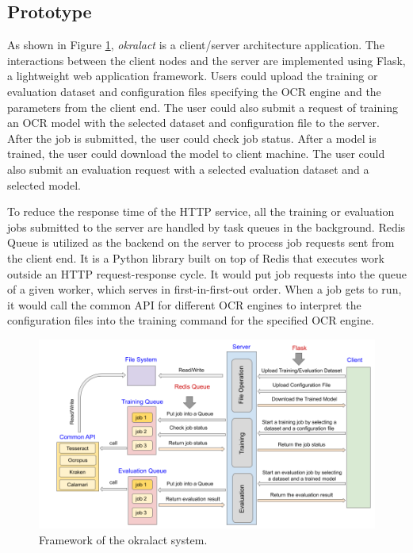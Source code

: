 \documentclass[conference]{IEEEtran}
\begin{document}

\subsection*{Prototype}
\label{sec:prototype}

As shown in Figure \ref{fig:framework}, \textit{okralact} is a client/server
architecture application. The interactions between the client nodes and the
server are implemented using Flask, a lightweight web application framework.
Users could upload the training or evaluation dataset and configuration files
specifying the OCR engine and the parameters    from the client end. The user
could also submit a request of training an OCR    model with the selected
dataset and configuration file to the server. After the job is submitted, the
user could check job status. After a model is trained,    the user could
download the model to client machine. The user could also submit an evaluation
request with a selected evaluation dataset and a selected model.

To reduce the response time of the HTTP service, all the training or evaluation
jobs submitted to the server are handled by task queues in the background.
Redis Queue is utilized as the backend on the server to process job requests
sent from the     client end. It is a Python library built on top of Redis that
executes work  outside an HTTP request-response cycle.  It would put job
requests into the      queue of a given worker, which serves in
first-in-first-out order. When a job   gets to run, it would call the common
API for different OCR engines to interpret the configuration files into the
training command for the specified OCR engine.

\begin{figure}[ht!]
        \begin{center}
     \includegraphics[width=0.8\linewidth]{Figures/Framework.png}
        \end{center}
        \caption{\small{Framework of the okralact system.}}
\label{fig:framework}
\end{figure}
\end{document}
